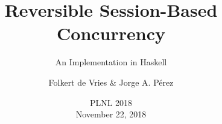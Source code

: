 \documentclass[12pt]{beamer}
\institute{University of Groningen, The Netherlands}
\title[\textcolor{white}{Reversible Session-Based Concurrency}]{Reversible Session-Based Concurrency}
\subtitle{An Implementation in Haskell}
\author[F. de Vries and J.\,A.\,P\'erez (Groningen)]{Folkert de Vries \& Jorge A. Pérez}
\date[November 22, 2018]
{
    PLNL 2018
\\
November 22, 2018
}
\begin{document}
%
%
%


\begin{frame}

\begin{center}
\maketitle
\end{center}

\end{frame}
\end{document}
